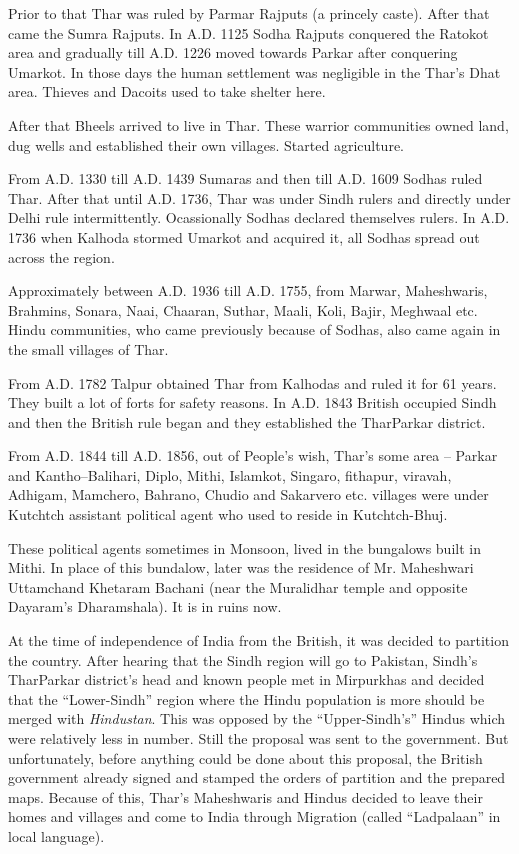Prior to that Thar was ruled by Parmar Rajputs (a princely caste). After that
came the Sumra Rajputs. In A.D. 1125 Sodha Rajputs conquered the Ratokot area
and gradually till A.D. 1226 moved towards Parkar after conquering Umarkot. In
those days the human settlement was negligible in the Thar's Dhat area. Thieves
and Dacoits used to take shelter here.

After that Bheels arrived to live in Thar. These warrior communities owned
land, dug wells and established their own villages. Started agriculture.

From A.D. 1330 till A.D. 1439 Sumaras and then till A.D. 1609 Sodhas ruled
Thar. After that until A.D. 1736, Thar was under Sindh rulers and directly
under Delhi rule intermittently. Ocassionally Sodhas declared themselves
rulers. In A.D. 1736 when Kalhoda stormed Umarkot and acquired it, all Sodhas
spread out across the region.

Approximately between A.D. 1936 till A.D. 1755, from Marwar, Maheshwaris,
Brahmins, Sonara, Naai, Chaaran, Suthar, Maali, Koli, Bajir, Meghwaal etc.
Hindu communities, who came previously because of Sodhas, also came again in
the small villages of Thar.

From A.D. 1782 Talpur obtained Thar from Kalhodas and ruled it for 61 years.
They built a lot of forts for safety reasons. In A.D. 1843 British occupied
Sindh and then the British rule began and they established the TharParkar
district.

From A.D. 1844 till A.D. 1856, out of People's wish, Thar's some area -- Parkar
and Kantho--Balihari, Diplo, Mithi, Islamkot, Singaro, fithapur, viravah,
Adhigam, Mamchero, Bahrano, Chudio and Sakarvero etc. villages were under
Kutchtch assistant political agent who used to reside in Kutchtch-Bhuj.

These political agents sometimes in Monsoon, lived in the bungalows built in
Mithi. In place of this bundalow, later was the residence of Mr. Maheshwari
Uttamchand Khetaram Bachani (near the Muralidhar temple and opposite Dayaram's
Dharamshala). It is in ruins now.

At the time of independence of India from the British, it was decided to
partition the country. After hearing that the Sindh region will go to Pakistan,
Sindh's TharParkar district's head and known people met in  Mirpurkhas and
decided that the ``Lower-Sindh'' region where the Hindu population is more
should be merged with \textit{Hindustan}. This was opposed by the
``Upper-Sindh's'' Hindus which were relatively less in number. Still the
proposal was sent to the government. But unfortunately, before anything could
be done about this proposal, the British government already signed and stamped
the orders of partition and the prepared maps. Because of this, Thar's
Maheshwaris and Hindus decided to leave their homes and villages and come to
India through Migration (called ``Ladpalaan'' in local language).

